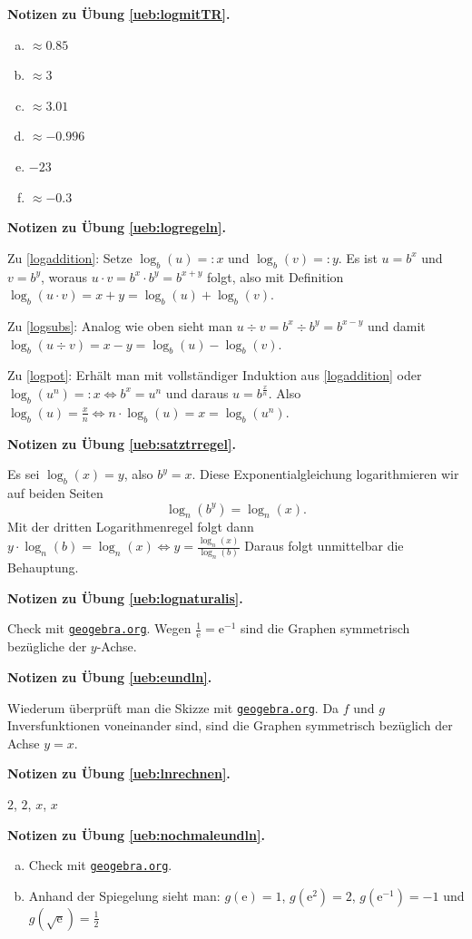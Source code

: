 \documentclass[%
11pt,%
twoside,%
titlepage,%
german,%
headsepline%
]{scrartcl}
\newcommand{\geogebralink}{\href{https://www.geogebra.org/calculator}{\texttt{geogebra.org}}}
\newcommand{\concatueb}[1]{ueb:#1}%
\newcommand{\concatlsg}[1]{lsg:#1}%
\newenvironment{lsg}[1]{%
    \par\noindent\textbf{Notizen zu Übung \ref{\concatueb{#1}}.}%
    \label{\concatlsg{#1}}
}{%
    \par%
}
\begin{document}
\begin{lsg}{logmitTR}
    \begin{enumerate}[a)]
        \item $\approx0.85$
        \item $\approx3$
        \item $\approx3.01$
        \item $\approx-0.996$
        \item $-23$
        \item $\approx-0.3$
    \end{enumerate}
\end{lsg}
\begin{lsg}{logregeln}
    Zu \eqref{logaddition}: Setze $\log_b(u)=:x$ und $\log_b(v)=:y$. Es ist $u=b^x$ und $v=b^y$, woraus $u\cdot v=b^x\cdot b^y=b^{x+y}$ folgt, also mit Definition $\log_b(u\cdot v)=x+y=\log_b(u)+\log_b(v)$.
    
    Zu \eqref{logsubs}: Analog wie oben sieht man $u\div v=b^x\div b^y=b^{x-y}$ und damit $\log_b(u\div v)=x-y=\log_b(u)-\log_b(v)$.

    Zu \eqref{logpot}: Erhält man mit vollständiger Induktion aus \eqref{logaddition} oder $\log_b(u^n)=:x\Leftrightarrow b^x=u^n$ und daraus $u=b^\frac{x}{n}$. Also $\log_b(u)=\frac{x}{n}\Leftrightarrow n\cdot\log_b(u)=x=\log_b(u^n)$.
\end{lsg}
\begin{lsg}{satztrregel}
  Es sei $\log_b{(x)} = y$, also
  $b^y=x$. Diese Exponentialgleichung logarithmieren wir auf beiden Seiten
  $$\log_n{(b^y)}=\log_n{(x)}.$$ Mit der dritten Logarithmenregel folgt dann
  $y\cdot\log_n{(b)}=\log_n{(x)}\Leftrightarrow
  y=\frac{\log_n{(x)}}{\log_n{(b)}}$
  Daraus folgt unmittelbar die Behauptung.
\end{lsg}
\begin{lsg}{lognaturalis}
    Check mit \geogebralink. Wegen $\frac{1}{\mathrm{e}}=\mathrm{e}^{-1}$ sind die Graphen symmetrisch bezügliche der $y$-Achse.
\end{lsg}
\begin{lsg}{eundln}
    Wiederum überprüft man die Skizze mit \geogebralink. Da $f$ und $g$ Inversfunktionen voneinander sind, sind die Graphen symmetrisch bezüglich der Achse $y=x$.
\end{lsg}
\begin{lsg}{lnrechnen}
    $2$, $2$, $x$, $x$
\end{lsg}
\begin{lsg}{nochmaleundln}
    \begin{enumerate}[a)]
        \item Check mit \geogebralink.
        \item Anhand der Spiegelung sieht man: $g(\mathrm{e})=1$, $g(\mathrm{e}^2)=2$, $g(\mathrm{e}^{-1})=-1$ und $g(\sqrt{\mathrm{e}})=\frac{1}{2}$
    \end{enumerate}
\end{lsg}
\end{document}
